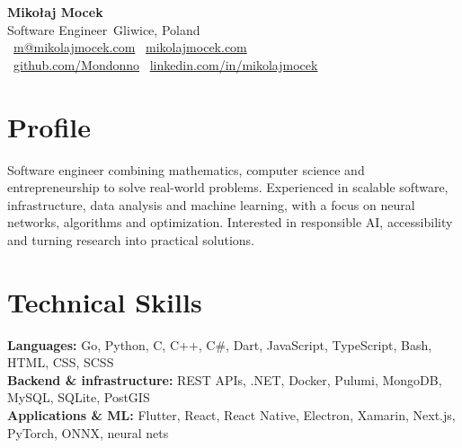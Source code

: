 \documentclass[10pt,a4paper]{article}
\begin{document}
{\fontsize{26}{29}\selectfont\bfseries Mikołaj Mocek}\\[4pt]
{\large Software Engineer}\hfill{\small\faMapMarker\ Gliwice, Poland}\\[6pt]
{\small\faEnvelope\ \href{mailto:m@mikolajmocek.com}{m@mikolajmocek.com}\enspace\textbar\enspace
\faGlobe\ \href{https://mikolajmocek.com}{mikolajmocek.com}\\[3pt]
\faGithub\ \href{https://github.com/Mondonno}{github.com/Mondonno}\enspace\textbar\enspace
\faLinkedin\ \href{https://www.linkedin.com/in/mikolajmocek/}{linkedin.com/in/mikolajmocek}}
\section{Profile}
Software engineer combining mathematics, computer science and entrepreneurship to solve real-world problems. Experienced in scalable software, infrastructure, data analysis and machine learning, with a focus on neural networks, algorithms and optimization. Interested in responsible AI, accessibility and turning research into practical solutions.
\section{Technical Skills}
\textbf{Languages:} Go, Python, C, C++, C\#, Dart, JavaScript, TypeScript, Bash, HTML, CSS, SCSS\\[3pt]
\textbf{Backend \& infrastructure:} REST APIs, .NET, Docker, Pulumi, MongoDB, MySQL, SQLite, PostGIS\\[3pt]
\textbf{Applications \& ML:} Flutter, React, React Native, Electron, Xamarin, Next.js, PyTorch, ONNX, neural nets
\end{document}
